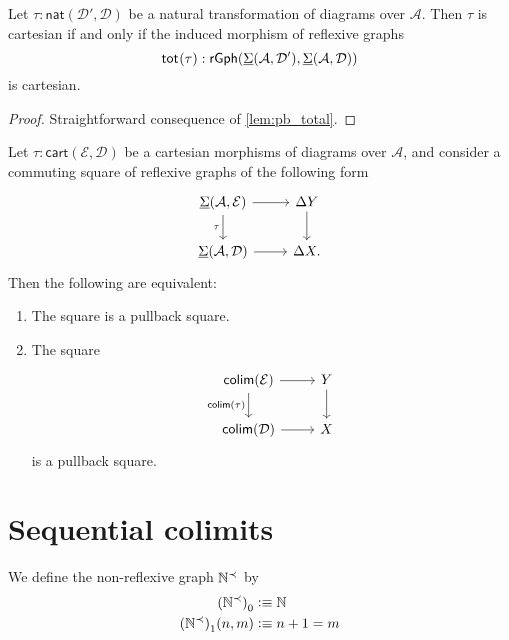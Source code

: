 \begin{prp}
Let $\tau:\mathsf{nat}(\mathcal{D}',\mathcal{D})$ be a natural transformation of diagrams over $\mathcal{A}$. Then $\tau$ is cartesian if and only if the induced morphism of reflexive graphs
\begin{equation*}
\mathsf{tot}_{}(\tau) : \mathsf{rGph}(\underline{\Sigma}(\mathcal{A},\mathcal{D}'),\underline{\Sigma}(\mathcal{A},\mathcal{D}))
\end{equation*}
is cartesian.
\end{prp}

\begin{proof}
Straightforward consequence of \cref{lem:pb_total}.
\end{proof}

\begin{cor}
Let $\tau:\mathsf{cart}(\mathcal{E},\mathcal{D})$ be a cartesian morphisms of diagrams over $\mathcal{A}$, and consider a commuting square of reflexive graphs of the following form
\begin{equation*}
\begin{tikzcd}
\msm{\mathcal{A}}{\mathcal{E}} \arrow[d,swap,"\tau"] \arrow[r] & \Delta Y \arrow[d] \\
\msm{\mathcal{A}}{\mathcal{D}} \arrow[r] & \Delta X.
\end{tikzcd}
\end{equation*}
Then the following are equivalent:
\begin{enumerate}
\item The square is a pullback square.
\item The square
\begin{equation*}
\begin{tikzcd}
\mathsf{colim}(\mathcal{E}) \arrow[r] \arrow[d,swap,"\mathsf{colim}(\tau)"] & Y \arrow[d] \\
\mathsf{colim}(\mathcal{D}) \arrow[r] & X
\end{tikzcd}
\end{equation*}
is a pullback square.
\end{enumerate}
\end{cor}

\section{Sequential colimits}

\begin{defn}
We define the non-reflexive graph $\mathbb{N}^{\prec}$ by 
\begin{align*}
\pts{(\N^{\prec})} & \defeq \N \\
\edg{(\N^{\prec})}(n,m) & \defeq n+1=m \\
\end{align*}
\end{defn}

